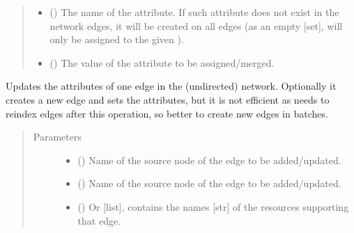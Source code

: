\documentclass[letterpaper,10pt,english]{sphinxmanual}
\begin{document}
\begin{fulllineitems}
\begin{fulllineitems}
\begin{quote}
\begin{description}
\begin{itemize}
\item {} 
 () \textendash{} The name of the attribute. If such attribute does not exist
in the network edges, it will be created on all edges (as an
empty {[}set{]},  will only be assigned to the given
).

\item {} 
 () \textendash{} The value of the attribute to be assigned/merged.

\end{itemize}

\end{description}\end{quote}

\end{fulllineitems}


\begin{fulllineitems}
\label{\detokenize{main:pypath.main.PyPath.add_update_edge}}
Updates the attributes of one edge in the (undirected) network.
Optionally it creates a new edge and sets the attributes, but it
is not efficient as  needs to reindex edges
after this operation, so better to create new edges in batches.
\begin{quote}\begin{description}
\item[{Parameters}] \leavevmode\begin{itemize}
\item {} 
 () \textendash{} Name of the source node of the edge to be added/updated.

\item {} 
 () \textendash{} Name of the source node of the edge to be added/updated.

\item {} 
 () \textendash{} Or {[}list{]}, contains the names {[}str{]} of the resources
supporting that edge.


\end{itemize}
\end{description}
\end{quote}
\end{fulllineitems}
\end{fulllineitems}
\end{document}
